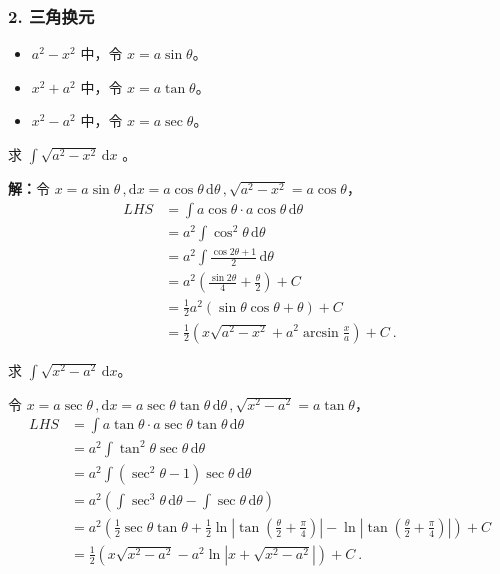 \subsubsection{2. 三角换元}
\begin{itemize}
\item $a^2-x^2$ 中，令 $x=a\sin\theta$。
\item $x^2+a^2$ 中，令 $x=a\tan \theta$。
\item $x^2-a^2$ 中，令 $x=a\sec\theta$。
\end{itemize}

\begin{example}{}
求 $\displaystyle{\int \sqrt{a^2-x^2}\,\mathrm{d}x}$ 。

\textbf{解：}令 $\displaystyle{x=a\sin\theta\,,\mathrm{d}x=a\cos\theta\,\mathrm{d}\theta\,,\sqrt{a^2-x^2}=a\cos\theta}$，
\begin{equation}
\begin{aligned}
LHS&=\int a\cos\theta\cdot a\cos\theta\,\mathrm{d}\theta\\ &=a^2\int\cos^2\theta\,\mathrm{d}\theta\\ &=a^2\int\frac{\cos2\theta+1}{2}\,\mathrm{d}\theta\\ &=a^2\left(\frac{\sin2\theta}{4}+\frac{\theta}{2}\right)+C\\ &=\frac{1}{2}a^2\left(\sin\theta\cos\theta+\theta\right)+C\\ &=\frac{1}{2}\left(x\sqrt{a^2-x^2}+a^2\arcsin\frac{x}{a}\right)+C~.
\end{aligned}
\end{equation}
\end{example}

\begin{example}{}
求 $\displaystyle{\int \sqrt{x^2-a^2}\,\mathrm{d}x}$。

令 $\displaystyle{x=a\sec\theta\,,\mathrm{d}x=a\sec\theta\tan\theta\,\mathrm{d}\theta\,,\sqrt{x^2-a^2}=a\tan\theta}$，
\begin{equation}
\begin{aligned}
LHS&=\int a\tan\theta\cdot a\sec\theta\tan\theta\,\mathrm{d}\theta\\ &=a^2\int \tan^2\theta \sec\theta\,\mathrm{d}\theta\\ &=a^2\int (\sec^2\theta-1)\sec\theta\,\mathrm{d}\theta\\ &=a^2\left(\int\sec^3\theta\,\mathrm{d}\theta-\int\sec\theta\,\mathrm{d}\theta\right)\\ &=a^2\left(\frac{1}{2}\sec\theta\tan\theta+\frac{1}2\ln\left|\tan\left(\frac{\theta}{2}+\frac{\pi}{4}\right)\right|-\ln\left|\tan\left(\frac{\theta}{2}+\frac{\pi}{4}\right)\right|\right)+C\\ &=\frac{1}{2}\left(x\sqrt{x^2-a^2}-a^2\ln|x+\sqrt{x^2-a^2}|\right)+C~.
\end{aligned}
\end{equation}
\end{example}

